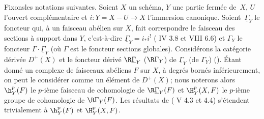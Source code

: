\subsection{}\label{XIV.1.0}
Fixons\pageoriginale les notations suivantes. Soient $X$ un sch\'ema, $Y$ une partie ferm\'ee de~$X$, $U$ l'ouvert compl\'ementaire et $i:Y=X-U\to X$ l'immersion canonique. Soient~$\underline{\Gamma}_Y$ le foncteur qui, \`a un faisceau ab\'elien sur $X$, fait correspondre le \og faisceau des sections \`a support dans $Y$\fg, c'est-\`a-dire $\underline{\Gamma}_Y=i_*i^!$ (\cf {} IV 3.8 et VIII 6.6) et $\Gamma_Y$ le foncteur $\Gamma\cdot \underline{\Gamma}_Y$ (o\`u $\Gamma$ est le foncteur \og sections globales{\fg}). Consid\'erons la cat\'egorie d\'eriv\'ee $D^+(X)$ et le foncteur d\'eriv\'e $\R\underline{\Gamma}_Y$ (\resp $\R\Gamma_Y$) de $\underline{\Gamma}_Y$ (\resp de $\Gamma_Y$) (\cf \cite{XIV.3}). \'Etant donn\'e un complexe de faisceaux ab\'eliens $F$ sur $X$, \`a degr\'es born\'es inf\'erieurement, on peut le consid\'erer comme un \'el\'ement de $D^+(X)$; nous noterons alors ${\h}_Y^p(F)$ le $p$-i\`eme faisceau de cohomologie de $\R\underline{\Gamma}_Y(F)$ et $\H_Y^p(X, F)$ le $p$-i\`eme groupe de cohomologie de $\R\Gamma_Y(F)$. Les r\'esultats de ( V 4.3 et 4.4) s'\'etendent trivialement \`a ${\h}_Y^p(F)$ et $\H_Y^p(X, F)$.

